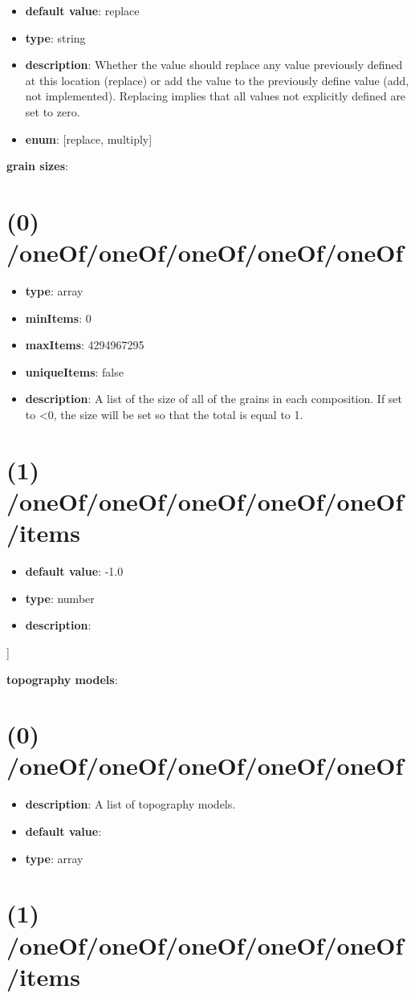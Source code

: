 \begin{itemize}[leftmargin=0em]\item {\bf default value}: replace
\item {\bf type}: string
\item {\bf description}: Whether the value should replace any value previously defined at this location (replace) or add the value to the previously define value (add, not implemented). Replacing implies that all values not explicitly defined are set to zero.
\item {\bf enum}: [replace, multiply]\end{itemize}\item {\bf grain sizes}: \section{(0) /oneOf/oneOf/oneOf/oneOf/oneOf}
\begin{itemize}[leftmargin=0em]\item {\bf type}: array
\item {\bf minItems}: 0
\item {\bf maxItems}: 4294967295
\item {\bf uniqueItems}: false
\item {\bf description}: A list of the size of all of the grains in each composition. If set to <0, the size will be set so that the total is equal to 1.
\end{itemize}\section{(1) /oneOf/oneOf/oneOf/oneOf/oneOf/items}
\begin{itemize}[leftmargin=1em]\item {\bf default value}: -1.0
\item {\bf type}: number
\item {\bf description}: 
\end{itemize}]\item {\bf topography models}: \section{(0) /oneOf/oneOf/oneOf/oneOf/oneOf}
\begin{itemize}[leftmargin=0em]\item {\bf description}: A list of topography models.
\item {\bf default value}: 
\item {\bf type}: array
\end{itemize}\section{(1) /oneOf/oneOf/oneOf/oneOf/oneOf/items}

